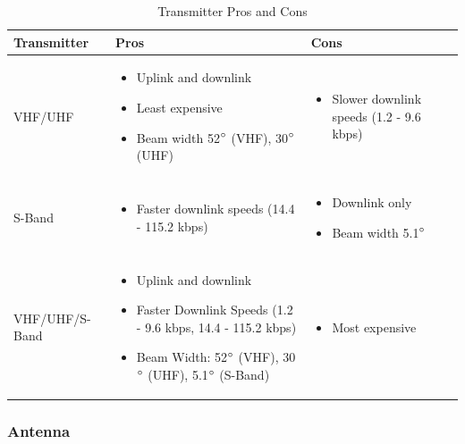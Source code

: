\begin{table}[H]
\centering
\begin{tabular}{|p{}|p{}|p{}|} 
\hline
\textbf{Transmitter} & \textbf{Pros} & \textbf{Cons}
\\
\hline
     VHF/UHF
     &
    \begin{itemize}
        \item Uplink and downlink
        \item Least expensive
        \item Beam width 52$\degree$ (VHF), 30$\degree$ (UHF)
    \end{itemize}
    &
    \begin{itemize}
        \item Slower downlink speeds (1.2 - 9.6 kbps)
    \end{itemize}
    \\
\hline
     S-Band
     &
    \begin{itemize}
        \item Faster downlink speeds (14.4 - 115.2 kbps)
    \end{itemize}
    &
        \begin{itemize}
        \item Downlink only
        \item Beam width 5.1$\degree$
    \end{itemize}
    \\
\hline
    VHF/UHF/S-Band
    &
    \begin{itemize}
        \item Uplink and downlink
        \item Faster Downlink Speeds (1.2 - 9.6 kbps, 14.4 - 115.2 kbps) 
        \item Beam Width: 52$\degree$ (VHF), 30$\degree$ (UHF), 5.1$\degree$ (S-Band)
    \end{itemize}
    &
    \begin{itemize}
        \item Most expensive
    \end{itemize}
    \\
\hline
\end{tabular}
\caption{Transmitter Pros and Cons \cite{isis_ground}}
\label{tbl:transmitter_procon}
\end{table}
\subsubsection{Antenna}

